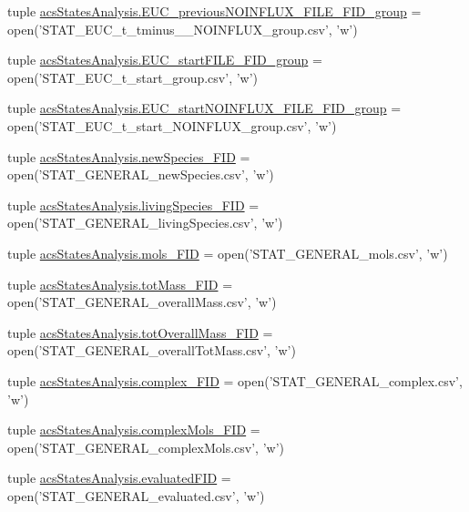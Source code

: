 \begin{DoxyCompactItemize}
tuple \hyperlink{a00104_ace5cf628b305f9110e058d7dafd27fb4}{acs\-States\-Analysis.\-E\-U\-C\-\_\-previous\-N\-O\-I\-N\-F\-L\-U\-X\-\_\-\-F\-I\-L\-E\-\_\-\-F\-I\-D\-\_\-group} = open('S\-T\-A\-T\-\_\-\-E\-U\-C\-\_\-t\-\_\-tminus\-\_\-\_\-\-N\-O\-I\-N\-F\-L\-U\-X\-\_\-group.\-csv', 'w')
\item 
tuple \hyperlink{a00104_abe1a2acadc97e46d55c6f4164c0890dc}{acs\-States\-Analysis.\-E\-U\-C\-\_\-start\-F\-I\-L\-E\-\_\-\-F\-I\-D\-\_\-group} = open('S\-T\-A\-T\-\_\-\-E\-U\-C\-\_\-t\-\_\-start\-\_\-group.\-csv', 'w')
\item 
tuple \hyperlink{a00104_aef08a333d5fed02e90483cc87e389ed0}{acs\-States\-Analysis.\-E\-U\-C\-\_\-start\-N\-O\-I\-N\-F\-L\-U\-X\-\_\-\-F\-I\-L\-E\-\_\-\-F\-I\-D\-\_\-group} = open('S\-T\-A\-T\-\_\-\-E\-U\-C\-\_\-t\-\_\-start\-\_\-\-N\-O\-I\-N\-F\-L\-U\-X\-\_\-group.\-csv', 'w')
\item 
tuple \hyperlink{a00104_abdb6e583333cc08cac8c63631db80b5b}{acs\-States\-Analysis.\-new\-Species\-\_\-\-F\-I\-D} = open('S\-T\-A\-T\-\_\-\-G\-E\-N\-E\-R\-A\-L\-\_\-new\-Species.\-csv', 'w')
\item 
tuple \hyperlink{a00104_ab7bbe9440116d34c9a373c40fc59bb3d}{acs\-States\-Analysis.\-living\-Species\-\_\-\-F\-I\-D} = open('S\-T\-A\-T\-\_\-\-G\-E\-N\-E\-R\-A\-L\-\_\-living\-Species.\-csv', 'w')
\item 
tuple \hyperlink{a00104_a603a41889d8732146d44da83ffaf0489}{acs\-States\-Analysis.\-mols\-\_\-\-F\-I\-D} = open('S\-T\-A\-T\-\_\-\-G\-E\-N\-E\-R\-A\-L\-\_\-mols.\-csv', 'w')
\item 
tuple \hyperlink{a00104_a1b7f5672822b59c7284cd2b703aacbc2}{acs\-States\-Analysis.\-tot\-Mass\-\_\-\-F\-I\-D} = open('S\-T\-A\-T\-\_\-\-G\-E\-N\-E\-R\-A\-L\-\_\-overall\-Mass.\-csv', 'w')
\item 
tuple \hyperlink{a00104_a20a06acdb6e82bcaab87d2781d3555a9}{acs\-States\-Analysis.\-tot\-Overall\-Mass\-\_\-\-F\-I\-D} = open('S\-T\-A\-T\-\_\-\-G\-E\-N\-E\-R\-A\-L\-\_\-overall\-Tot\-Mass.\-csv', 'w')
\item 
tuple \hyperlink{a00104_ace41560d233dff88c3073be734bae944}{acs\-States\-Analysis.\-complex\-\_\-\-F\-I\-D} = open('S\-T\-A\-T\-\_\-\-G\-E\-N\-E\-R\-A\-L\-\_\-complex.\-csv', 'w')
\item 
tuple \hyperlink{a00104_a2ef28958c50aabe7867b32f8dd6f4ace}{acs\-States\-Analysis.\-complex\-Mols\-\_\-\-F\-I\-D} = open('S\-T\-A\-T\-\_\-\-G\-E\-N\-E\-R\-A\-L\-\_\-complex\-Mols.\-csv', 'w')
\item 
tuple \hyperlink{a00104_a2cc9b964c81489c25978be53ab38eb16}{acs\-States\-Analysis.\-evaluated\-F\-I\-D} = open('S\-T\-A\-T\-\_\-\-G\-E\-N\-E\-R\-A\-L\-\_\-evaluated.\-csv', 'w')

\end{DoxyCompactItemize}
